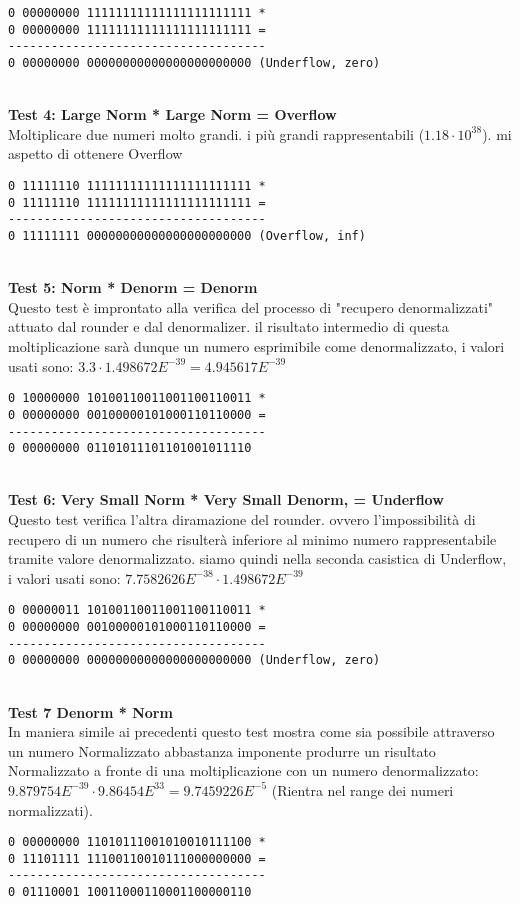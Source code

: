 \documentclass[twoside,11pt]{article}
\begin{document}
{\begin{verbatim}
0 00000000 11111111111111111111111 *
0 00000000 11111111111111111111111 =
------------------------------------
0 00000000 00000000000000000000000 (Underflow, zero)
\end{verbatim}

\\
\vspace{2em}
\textbf{Test 4: Large Norm * Large Norm  = Overflow}
\\
Moltiplicare due numeri molto grandi. i più grandi rappresentabili ($1.18\cdot10^{38}$). mi aspetto di ottenere Overflow
\begin{verbatim}
0 11111110 11111111111111111111111 *
0 11111110 11111111111111111111111 =
------------------------------------
0 11111111 00000000000000000000000 (Overflow, inf)
\end{verbatim}


\newpage
\\
\vspace{2em}
\textbf{Test 5: Norm * Denorm = Denorm}
\\
Questo test è improntato alla verifica del processo di "recupero denormalizzati" attuato dal rounder e dal denormalizer. il risultato intermedio di questa moltiplicazione sarà dunque un numero esprimibile come denormalizzato, i valori usati sono: $3.3 \cdot 1.498672E^{-39} = 4.945617E^{-39}$
\begin{verbatim}
0 10000000 10100110011001100110011 *
0 00000000 00100000101000110110000 =
------------------------------------
0 00000000 01101011101101001011110
\end{verbatim}



\\
\vspace{2em}
\textbf{Test 6: Very Small Norm * Very Small Denorm, = Underflow}
\\
Questo test verifica l’altra diramazione del rounder. ovvero l’impossibilità di recupero di un numero che risulterà inferiore al minimo numero rappresentabile tramite valore denormalizzato. siamo quindi nella seconda casistica di Underflow, i valori usati sono: $7.7582626E^{-38} \cdot 1.498672E^{-39}$
\begin{verbatim}
0 00000011 10100110011001100110011 *
0 00000000 00100000101000110110000 =
------------------------------------
0 00000000 00000000000000000000000 (Underflow, zero)
\end{verbatim}

\\
\vspace{2em}
\textbf{Test 7 Denorm * Norm}
\\
In maniera simile ai precedenti questo test mostra come sia possibile attraverso un numero Normalizzato abbastanza imponente produrre un risultato Normalizzato a fronte di una moltiplicazione con un numero denormalizzato: $9.879754E^{-39} \cdot 9.86454E^{33} = 9.7459226E^{-5}$ (Rientra nel range dei numeri normalizzati).
\begin{verbatim}
0 00000000 11010111001010010111100 *
0 11101111 11100110010111000000000 =
------------------------------------
0 01110001 10011000110001100000110
\end{verbatim}


}
\end{document}
